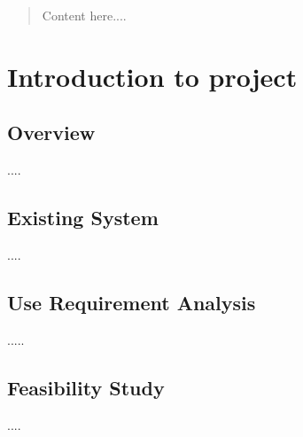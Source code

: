 \documentclass[12pt]{myclass}
\subtitle{subtitle}
\author{your name}
\begin{document}
 \maketitle                                 %


\cfoot{\thepage}                       %

\begin{abstract}
Content here....
\end{abstract}

%




\tableofcontents                       %

\listoffigures                         %
\newpage

\cfoot{\thepage}                        %



\section{Introduction to project}
\subsection{Overview}
....
\subsection{Existing System}
....
\subsection{Use Requirement Analysis}
.....
\subsection{Feasibility Study}
....
\end{document}
